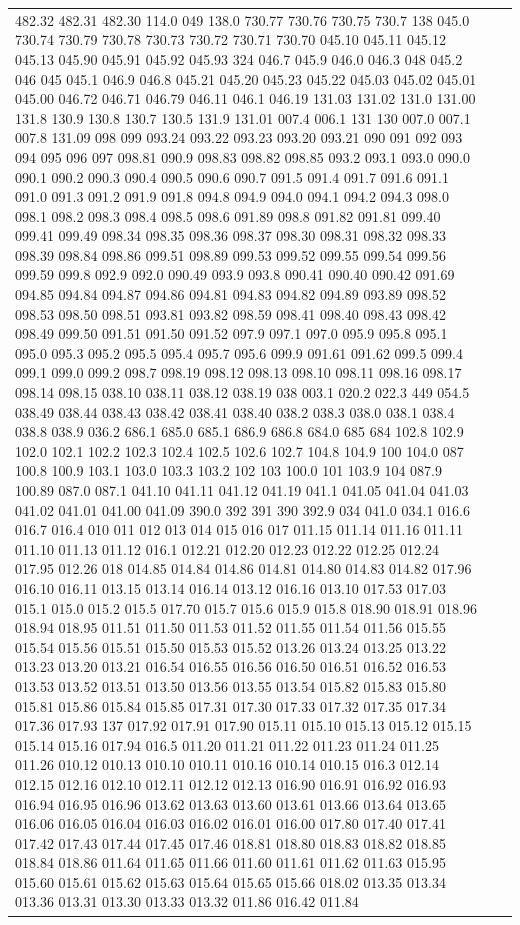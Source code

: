 \documentclass[3p,super,numbers,sort&compress,preprint,10pt]{elsarticle}
\begin{document}
\begin{longtable}{|L{.1in}|L{.6in}||L{5.65in}|}
482.32 482.31 482.30 114.0 049 138.0 730.77 730.76 730.75 730.7 138 045.0 730.74 730.79 730.78 730.73 730.72 730.71 730.70 045.10 045.11 045.12 045.13 045.90 045.91 045.92 045.93 324 046.7 045.9 046.0 046.3 048 045.2 046 045 045.1 046.9 046.8 045.21 045.20 045.23 045.22 045.03 045.02 045.01 045.00 046.72 046.71 046.79 046.11 046.1 046.19 131.03 131.02 131.0 131.00 131.8 130.9 130.8 130.7 130.5 131.9 131.01 007.4 006.1 131 130 007.0 007.1 007.8 131.09 098 099 093.24 093.22 093.23 093.20 093.21 090 091 092 093 094 095 096 097 098.81 090.9 098.83 098.82 098.85 093.2 093.1 093.0 090.0 090.1 090.2 090.3 090.4 090.5 090.6 090.7 091.5 091.4 091.7 091.6 091.1 091.0 091.3 091.2 091.9 091.8 094.8 094.9 094.0 094.1 094.2 094.3 098.0 098.1 098.2 098.3 098.4 098.5 098.6 091.89 098.8 091.82 091.81 099.40 099.41 099.49 098.34 098.35 098.36 098.37 098.30 098.31 098.32 098.33 098.39 098.84 098.86 099.51 098.89 099.53 099.52 099.55 099.54 099.56 099.59 099.8 092.9 092.0 090.49 093.9 093.8 090.41 090.40 090.42 091.69 094.85 094.84 094.87 094.86 094.81 094.83 094.82 094.89 093.89 098.52 098.53 098.50 098.51 093.81 093.82 098.59 098.41 098.40 098.43 098.42 098.49 099.50 091.51 091.50 091.52 097.9 097.1 097.0 095.9 095.8 095.1 095.0 095.3 095.2 095.5 095.4 095.7 095.6 099.9 091.61 091.62 099.5 099.4 099.1 099.0 099.2 098.7 098.19 098.12 098.13 098.10 098.11 098.16 098.17 098.14 098.15 038.10 038.11 038.12 038.19 038 003.1 020.2 022.3 449 054.5 038.49 038.44 038.43 038.42 038.41 038.40 038.2 038.3 038.0 038.1 038.4 038.8 038.9 036.2 686.1 685.0 685.1 686.9 686.8 684.0 685 684 102.8 102.9 102.0 102.1 102.2 102.3 102.4 102.5 102.6 102.7 104.8 104.9 100 104.0 087 100.8 100.9 103.1 103.0 103.3 103.2 102 103 100.0 101 103.9 104 087.9 100.89 087.0 087.1 041.10 041.11 041.12 041.19 041.1 041.05 041.04 041.03 041.02 041.01 041.00 041.09 390.0 392 391 390 392.9 034 041.0 034.1 016.6 016.7 016.4 010 011 012 013 014 015 016 017 011.15 011.14 011.16 011.11 011.10 011.13 011.12 016.1 012.21 012.20 012.23 012.22 012.25 012.24 017.95 012.26 018 014.85 014.84 014.86 014.81 014.80 014.83 014.82 017.96 016.10 016.11 013.15 013.14 016.14 013.12 016.16 013.10 017.53 017.03 015.1 015.0 015.2 015.5 017.70 015.7 015.6 015.9 015.8 018.90 018.91 018.96 018.94 018.95 011.51 011.50 011.53 011.52 011.55 011.54 011.56 015.55 015.54 015.56 015.51 015.50 015.53 015.52 013.26 013.24 013.25 013.22 013.23 013.20 013.21 016.54 016.55 016.56 016.50 016.51 016.52 016.53 013.53 013.52 013.51 013.50 013.56 013.55 013.54 015.82 015.83 015.80 015.81 015.86 015.84 015.85 017.31 017.30 017.33 017.32 017.35 017.34 017.36 017.93 137 017.92 017.91 017.90 015.11 015.10 015.13 015.12 015.15 015.14 015.16 017.94 016.5 011.20 011.21 011.22 011.23 011.24 011.25 011.26 010.12 010.13 010.10 010.11 010.16 010.14 010.15 016.3 012.14 012.15 012.16 012.10 012.11 012.12 012.13 016.90 016.91 016.92 016.93 016.94 016.95 016.96 013.62 013.63 013.60 013.61 013.66 013.64 013.65 016.06 016.05 016.04 016.03 016.02 016.01 016.00 017.80 017.40 017.41 017.42 017.43 017.44 017.45 017.46 018.81 018.80 018.83 018.82 018.85 018.84 018.86 011.64 011.65 011.66 011.60 011.61 011.62 011.63 015.95 015.60 015.61 015.62 015.63 015.64 015.65 015.66 018.02 013.35 013.34 013.36 013.31 013.30 013.33 013.32 011.86 016.42 011.84 
\end{longtable}
\end{document}
